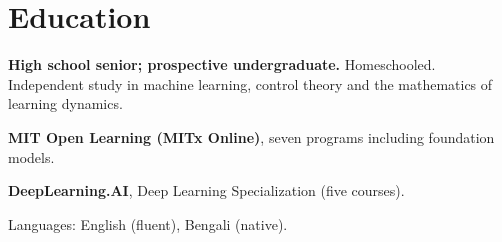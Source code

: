 \documentclass[10pt,a4paper]{article}
\newcommand{\cvitem}[3]{%
  \begin{list}{}{%
    \setlength{\leftmargin}{2.35cm}%
    \setlength{\labelwidth}{2.1cm}%
    \setlength{\labelsep}{0.25cm}%
    \setlength{\itemindent}{0pt}%
    \setlength{\listparindent}{0pt}%
    \setlength{\rightmargin}{0pt}%
    \setlength{\topsep}{0pt}%
    \setlength{\partopsep}{0pt}%
    \setlength{\parsep}{0pt}%
    \setlength{\itemsep}{0pt}%
  }%
  \item[{\makebox[2.1cm][l]{\footnotesize\color{muted}#1}}]%
  #2
  #3
  \end{list}%
  \vspace{1.5pt}
}
\begin{document}
\section*{Education}
\cvitem{present}{\textbf{High school senior; prospective undergraduate.} Homeschooled. Independent study in machine learning, control theory and the mathematics of learning dynamics.}{}
\cvitem{2025--2026}{\textbf{MIT Open Learning (MITx Online)}, seven programs including foundation models.}{}
\cvitem{2025--2026}{\textbf{DeepLearning.AI}, Deep Learning Specialization (five courses).}{}
\cvitem{}{Languages: English (fluent), Bengali (native).}{}
\end{document}
